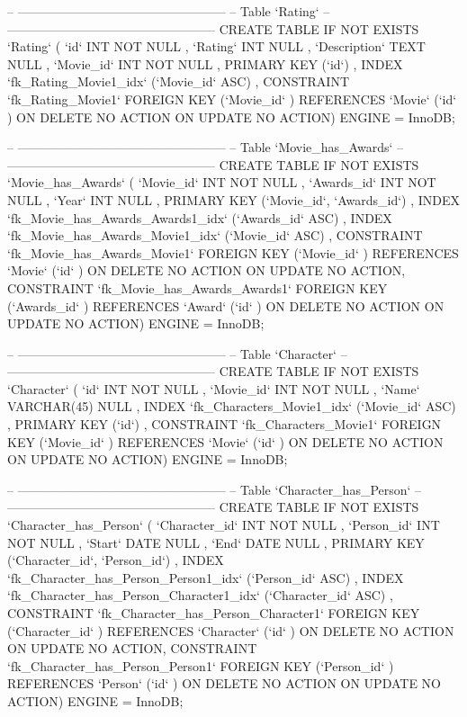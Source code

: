 \begin{spverbatim}
-- --------------------------------------------------
-- Table `Rating`
-- --------------------------------------------------
CREATE  TABLE IF NOT EXISTS `Rating` (
  `id` INT NOT NULL ,
  `Rating` INT NULL ,
  `Description` TEXT NULL ,
  `Movie_id` INT NOT NULL ,
  PRIMARY KEY (`id`) ,
  INDEX `fk_Rating_Movie1_idx` (`Movie_id` ASC) ,
  CONSTRAINT `fk_Rating_Movie1`
    FOREIGN KEY (`Movie_id` )
    REFERENCES `Movie` (`id` )
    ON DELETE NO ACTION
    ON UPDATE NO ACTION)
ENGINE = InnoDB;


-- --------------------------------------------------
-- Table `Movie_has_Awards`
-- --------------------------------------------------
CREATE  TABLE IF NOT EXISTS `Movie_has_Awards` (
  `Movie_id` INT NOT NULL ,
  `Awards_id` INT NOT NULL ,
  `Year` INT NULL ,
  PRIMARY KEY (`Movie_id`, `Awards_id`) ,
  INDEX `fk_Movie_has_Awards_Awards1_idx` (`Awards_id` ASC) ,
  INDEX `fk_Movie_has_Awards_Movie1_idx` (`Movie_id` ASC) ,
  CONSTRAINT `fk_Movie_has_Awards_Movie1`
    FOREIGN KEY (`Movie_id` )
    REFERENCES `Movie` (`id` )
    ON DELETE NO ACTION
    ON UPDATE NO ACTION,
  CONSTRAINT `fk_Movie_has_Awards_Awards1`
    FOREIGN KEY (`Awards_id` )
    REFERENCES `Award` (`id` )
    ON DELETE NO ACTION
    ON UPDATE NO ACTION)
ENGINE = InnoDB;


-- --------------------------------------------------
-- Table `Character`
-- --------------------------------------------------
CREATE  TABLE IF NOT EXISTS `Character` (
  `id` INT NOT NULL ,
  `Movie_id` INT NOT NULL ,
  `Name` VARCHAR(45) NULL ,
  INDEX `fk_Characters_Movie1_idx` (`Movie_id` ASC) ,
  PRIMARY KEY (`id`) ,
  CONSTRAINT `fk_Characters_Movie1`
    FOREIGN KEY (`Movie_id` )
    REFERENCES `Movie` (`id` )
    ON DELETE NO ACTION
    ON UPDATE NO ACTION)
ENGINE = InnoDB;


-- --------------------------------------------------
-- Table `Character_has_Person`
-- --------------------------------------------------
CREATE  TABLE IF NOT EXISTS `Character_has_Person` (
  `Character_id` INT NOT NULL ,
  `Person_id` INT NOT NULL ,
  `Start` DATE NULL ,
  `End` DATE NULL ,
  PRIMARY KEY (`Character_id`, `Person_id`) ,
  INDEX `fk_Character_has_Person_Person1_idx` (`Person_id` ASC) ,
  INDEX `fk_Character_has_Person_Character1_idx` (`Character_id` ASC) ,
  CONSTRAINT `fk_Character_has_Person_Character1`
    FOREIGN KEY (`Character_id` )
    REFERENCES `Character` (`id` )
    ON DELETE NO ACTION
    ON UPDATE NO ACTION,
  CONSTRAINT `fk_Character_has_Person_Person1`
    FOREIGN KEY (`Person_id` )
    REFERENCES `Person` (`id` )
    ON DELETE NO ACTION
    ON UPDATE NO ACTION)
ENGINE = InnoDB;



\end{spverbatim}
